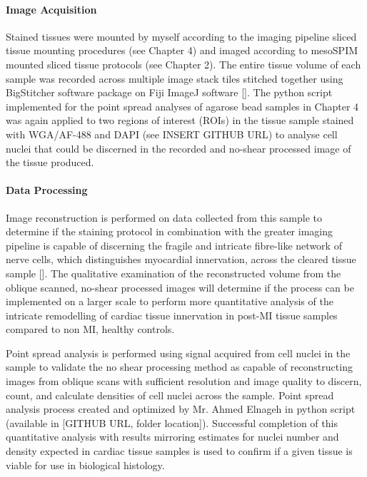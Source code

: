 \paragraph{Image Acquisition}

Stained tissues were mounted by myself according to the imaging pipeline sliced tissue mounting procedures (see Chapter 4) and imaged according to mesoSPIM mounted sliced tissue protocols (see Chapter 2). The entire tissue volume of each sample was recorded across multiple image stack tiles stitched together using BigStitcher software package on Fiji ImageJ software []. The python script implemented for the point spread analyses of agarose bead samples in Chapter 4 was again applied to two regions of interest (ROIs) in the tissue sample stained with WGA/AF-488 and DAPI (see INSERT GITHUB URL) to analyse cell nuclei that could be discerned in the recorded and no-shear processed image of the tissue produced. 

\paragraph{Data Processing}

Image reconstruction is performed on data collected from this sample to determine if the staining protocol in combination with the greater imaging pipeline is capable of discerning the fragile and intricate fibre-like network of nerve cells, which distinguishes myocardial innervation, across the cleared tissue sample []. The qualitative examination of the reconstructed volume from the oblique scanned, no-shear processed images will determine if the process can be implemented on a larger scale to perform more quantitative analysis of the intricate remodelling of cardiac tissue innervation in post-MI tissue samples compared to non MI, healthy controls. 

Point spread analysis is performed using signal acquired from cell nuclei in the sample to validate the no shear processing method as capable of reconstructing images from oblique scans with sufficient resolution and image quality to discern, count, and calculate densities of cell nuclei across the sample. Point spread analysis process created and optimized by Mr. Ahmed Elnageh in python script (available in [GITHUB URL, folder location]). Successful completion of this quantitative analysis with results mirroring estimates for nuclei number and density expected in cardiac tissue samples is used to confirm if a given tissue is viable for use in biological histology. 




